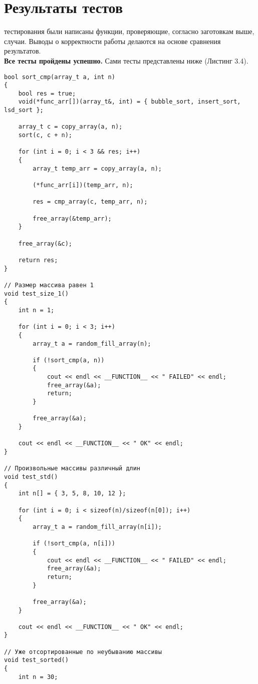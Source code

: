 \section{Результаты тестов}
 тестирования были написаны функции, проверяющие, согласно заготовкам выше, случаи. Выводы о корректности работы делаются на основе сравнения результатов.\\

\textbf{Все тесты пройдены успешно.} Сами тесты представлены ниже (Листинг 3.4).\\

\begin{lstlisting}[label=code, caption = Тесты]
bool sort_cmp(array_t a, int n)
{
	bool res = true;
	void(*func_arr[])(array_t&, int) = { bubble_sort, insert_sort, lsd_sort };
	
	array_t c = copy_array(a, n);
	sort(c, c + n);
	
	for (int i = 0; i < 3 && res; i++)
	{
		array_t temp_arr = copy_array(a, n);
		
		(*func_arr[i])(temp_arr, n);
		
		res = cmp_array(c, temp_arr, n);
		
		free_array(&temp_arr);
	}
	
	free_array(&c);
	
	return res;
}

// Размер массива равен 1
void test_size_1()
{
	int n = 1;
	
	for (int i = 0; i < 3; i++)
	{
		array_t a = random_fill_array(n);
		
		if (!sort_cmp(a, n))
		{
			cout << endl << __FUNCTION__ << " FAILED" << endl;
			free_array(&a);
			return;
		}
		
		free_array(&a);
	}
	
	cout << endl << __FUNCTION__ << " OK" << endl;
}

// Произвольные массивы различный длин
void test_std()
{
	int n[] = { 3, 5, 8, 10, 12 };
	
	for (int i = 0; i < sizeof(n)/sizeof(n[0]); i++)
	{
		array_t a = random_fill_array(n[i]);
		
		if (!sort_cmp(a, n[i]))
		{
			cout << endl << __FUNCTION__ << " FAILED" << endl;
			free_array(&a);
			return;
		}
		
		free_array(&a);
	}
	
	cout << endl << __FUNCTION__ << " OK" << endl;
}

// Уже отсортированные по неубыванию массивы
void test_sorted()
{
	int n = 30;
	

\end{lstlisting}
